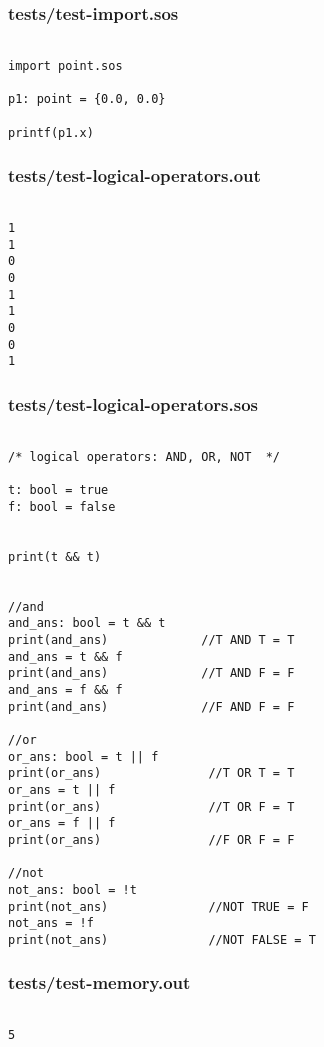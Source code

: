\documentclass[main.tex]{subfiles}
\begin{document}
\subsubsection{tests/test-import.sos}

\begin{lstlisting}

import point.sos

p1: point = {0.0, 0.0}

printf(p1.x)
\end{lstlisting}

\subsubsection{tests/test-logical-operators.out}

\begin{lstlisting}

1
1
0
0
1
1
0
0
1
\end{lstlisting}

\subsubsection{tests/test-logical-operators.sos}

\begin{lstlisting}

/* logical operators: AND, OR, NOT  */

t: bool = true
f: bool = false


print(t && t)


//and
and_ans: bool = t && t
print(and_ans)             //T AND T = T
and_ans = t && f
print(and_ans)             //T AND F = F
and_ans = f && f
print(and_ans)             //F AND F = F

//or
or_ans: bool = t || f
print(or_ans)               //T OR T = T
or_ans = t || f
print(or_ans)               //T OR F = T
or_ans = f || f
print(or_ans)               //F OR F = F

//not
not_ans: bool = !t
print(not_ans)              //NOT TRUE = F
not_ans = !f
print(not_ans)              //NOT FALSE = T
\end{lstlisting}

\subsubsection{tests/test-memory.out}

\begin{lstlisting}

5
\end{lstlisting}
\end{document}
